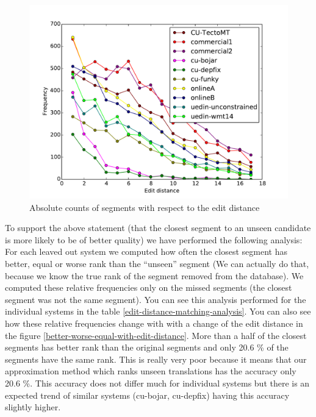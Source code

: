 \begin{figure}
    \begin{center}
        \includegraphics[width=14cm]{img/absolute-counts-per-distance.pdf}
    \end{center}

    \caption[Absolute counts of matched segments with respect to the edit distance]
    {Absolute counts of segments with respect to the edit distance}

    \label{absolute-counts-per-distance}
\end{figure}


To support the above statement (that the closest segment to an unseen candidate
is more likely to be of better quality) we have performed the following
analysis: For each leaved out system we computed how often the closest segment
has better, equal or worse rank than the ``unseen'' segment (We can actually do
that, because we know the true rank of the segment removed from the database).
We computed these relative frequencies only on the missed segments (the closest
segment was not the same segment). You can see this analysis performed for the
individual systems in the table \ref{edit-distance-matching-analysis}.  You can
also see how these relative frequencies change with with a change of the edit
distance in the figure \ref{better-worse-equal-with-edit-distance}. More than a
half of the closest segments has better rank than the original segments and
only 20.6 \% of the segments have the same rank. This is really very poor
because it means that our approximation method which ranks unseen translations
has the accuracy only 20.6 \%. This accuracy does not differ much for
individual systems but there is an expected trend of similar systems (cu-bojar,
cu-depfix) having this accuracy slightly higher. 

